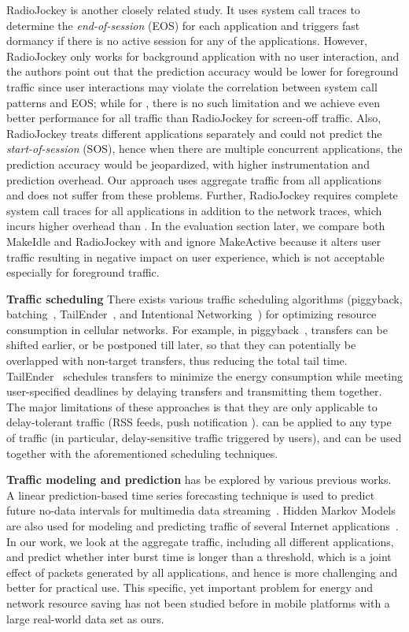 RadioJockey\cite{radiojockey} is another closely related study. It uses system call traces to determine the {\em end-of-session} (EOS) for each application and triggers fast dormancy if there is no active session for any of the applications. However, RadioJockey only works for background application with no user interaction, and the authors point out that the prediction accuracy would be lower for foreground traffic since user interactions may violate the correlation between system call patterns and EOS; while for \NAME, there is no such limitation and we achieve even better performance for all traffic than RadioJockey for screen-off traffic. Also, RadioJockey treats different applications separately and could not predict the {\em start-of-session} (SOS), hence when there are multiple concurrent applications, the prediction accuracy would be jeopardized, with higher instrumentation and prediction overhead. Our approach uses aggregate traffic from all applications and does not suffer from these problems. Further, RadioJockey requires complete system call traces for all applications in addition to the network traces, which incurs higher overhead than \NAME. In the evaluation section later, we compare both MakeIdle and RadioJockey with \NAME and ignore MakeActive because it alters user traffic resulting in negative impact on user experience, which is not acceptable especially for foreground traffic.


\textbf{Traffic scheduling} There exists various traffic scheduling algorithms (\eg piggyback, batching~\cite{qian12_www}, TailEnder~\cite{imc.tailender}, and Intentional Networking~\cite{higgins10}) for optimizing resource consumption in cellular networks. For example, in piggyback~\cite{qian12_www}, transfers can be shifted earlier, or be postponed till later, so that they can potentially be overlapped with non-target transfers, thus reducing the total tail time. TailEnder~\cite{imc.tailender} schedules transfers to minimize the energy consumption while meeting user-specified deadlines by delaying transfers and transmitting them together. The major limitations of these approaches is that they are only applicable to delay-tolerant traffic (RSS feeds, push notification \etc). \NAME can be applied to any type of traffic (in particular, delay-sensitive traffic triggered by users), and can be used together with the aforementioned scheduling techniques.

\textbf{Traffic modeling and prediction} has be explored by various previous works. A linear prediction-based time series forecasting technique is used to predict future no-data intervals for multimedia data streaming~\cite{wcnc04}. Hidden Markov Models are also used for modeling and predicting traffic of several Internet applications~\cite{Dainotti20082645}. In our work, we look at the aggregate traffic, including all different applications, and predict whether inter burst time is longer than a threshold, which is a joint effect of packets generated by all applications, and hence is more challenging and better for practical use. This specific, yet important problem for energy and network resource saving has not been studied before in mobile platforms with a large real-world data set as ours.

